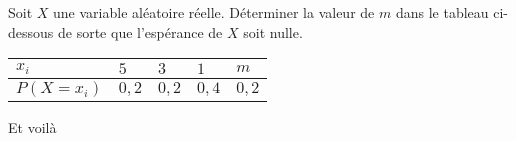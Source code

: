 \documentclass[11pt]{article}
\begin{document}
\begin{exo}
Soit $X$ une variable aléatoire réelle. Déterminer la
valeur de $m$ dans le tableau ci-dessous de sorte que l'espérance de $X$ soit
nulle.
\begin{center}
  \renewcommand{\arraystretch}{1.3}
  \begin{tabularx}{.7\textwidth}{|Y|Y|Y|Y|Y|}
    \hline
    $x_i$ & $5$ & $3$ & $1$ & $m$ \\
    \hline
    $P\left( X=x_i \right)$ & $0,2$ & $0,2$ & $0,4$ & $0,2$\\
    \hline
  \end{tabularx}
\end{center}
\end{exo}

\begin{exo}
  Et voilà
\end{exo}
\end{document}
